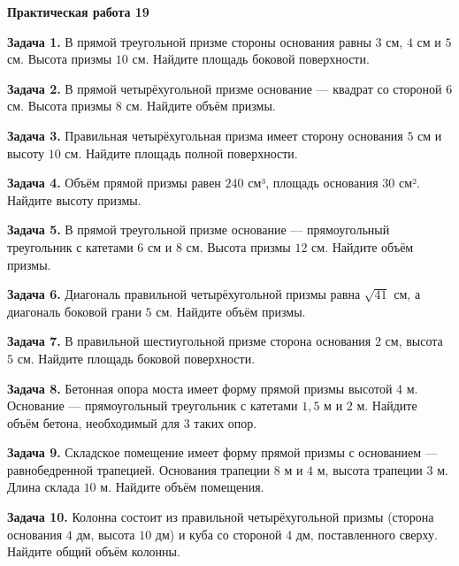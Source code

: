 \documentclass{umk-matematika}
\begin{document}
\begin{center}
{\Large\bfseries Практическая работа 19}
\end{center}
\vspace{0.5cm}

\textbf{Задача 1.} В прямой треугольной призме стороны основания равны $3$ см, $4$ см и $5$ см. Высота призмы $10$ см. Найдите площадь боковой поверхности.\par\vspace{10pt}
\textbf{Задача 2.} В прямой четырёхугольной призме основание — квадрат со стороной $6$ см. Высота призмы $8$ см. Найдите объём призмы.\par\vspace{10pt}
\textbf{Задача 3.} Правильная четырёхугольная призма имеет сторону основания $5$ см и высоту $10$ см. Найдите площадь полной поверхности.\par\vspace{10pt}
\textbf{Задача 4.} Объём прямой призмы равен $240$ см³, площадь основания $30$ см². Найдите высоту призмы.\par\vspace{10pt}
\textbf{Задача 5.} В прямой треугольной призме основание — прямоугольный треугольник с катетами $6$ см и $8$ см. Высота призмы $12$ см. Найдите объём призмы.\par\vspace{10pt}
\textbf{Задача 6.} Диагональ правильной четырёхугольной призмы равна $\sqrt{41}$ см, а диагональ боковой грани $5$ см. Найдите объём призмы.\par\vspace{10pt}
\textbf{Задача 7.} В правильной шестиугольной призме сторона основания $2$ см, высота $5$ см. Найдите площадь боковой поверхности.\par\vspace{10pt}
\textbf{Задача 8.} Бетонная опора моста имеет форму прямой призмы высотой $4$ м. Основание — прямоугольный треугольник с катетами $1{,}5$ м и $2$ м. Найдите объём бетона, необходимый для $3$ таких опор.\par\vspace{10pt}
\textbf{Задача 9.} Складское помещение имеет форму прямой призмы с основанием — равнобедренной трапецией. Основания трапеции $8$ м и $4$ м, высота трапеции $3$ м. Длина склада $10$ м. Найдите объём помещения.\par\vspace{10pt}
\textbf{Задача 10.} Колонна состоит из правильной четырёхугольной призмы (сторона основания $4$ дм, высота $10$ дм) и куба со стороной $4$ дм, поставленного сверху. Найдите общий объём колонны.\par\vspace{10pt}
\newpage
\end{document}
